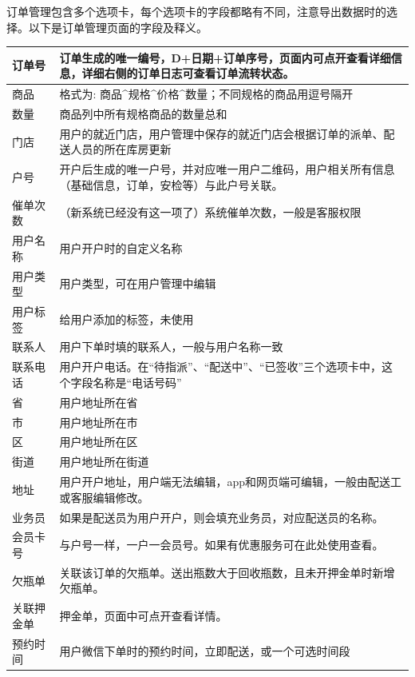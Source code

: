 \documentclass[UTF8]{ctexart}
\begin{document}
订单管理包含多个选项卡，每个选项卡的字段都略有不同，注意导出数据时的选择。以下是订单管理页面的字段及释义。

\begin{longtable}[h!]{ | m{3cm} | m{12cm} | } 

		\hline
		订单号 & 订单生成的唯一编号，D+日期+订单序号，页面内可点开查看详细信息，详细右侧的订单日志可查看订单流转状态。\\
		\hline
		商品 & 格式为: 商品\^{}规格\^{}价格\^{}数量；不同规格的商品用逗号隔开\\
		\hline
		数量 & 商品列中所有规格商品的数量总和\\
		\hline
		门店 & 用户的就近门店，用户管理中保存的就近门店会根据订单的派单、配送人员的所在库房更新\\
		\hline
		户号 & 开户后生成的唯一户号，并对应唯一用户二维码，用户相关所有信息（基础信息，订单，安检等）与此户号关联。\\
		\hline
		催单次数 & （新系统已经没有这一项了）系统催单次数，一般是客服权限\\
		\hline
		用户名称& 用户开户时的自定义名称\\
		\hline
		用户类型& 用户类型，可在用户管理中编辑\\
		\hline
		用户标签& 给用户添加的标签，未使用\\
		\hline
		联系人& 用户下单时填的联系人，一般与用户名称一致\\
		\hline
		联系电话& 用户开户电话。在“待指派”、“配送中”、“已签收”三个选项卡中，这个字段名称是“电话号码”\\
		\hline
		省& 用户地址所在省\\
		\hline
		市& 用户地址所在市\\
		\hline
		区& 用户地址所在区\\
		\hline
		街道& 用户地址所在街道\\
		\hline
		地址& 用户开户地址，用户端无法编辑，app和网页端可编辑，一般由配送工或客服编辑修改。 \\
		\hline
		业务员& 如果是配送员为用户开户，则会填充业务员，对应配送员的名称。\\
		\hline
		会员卡号& 与户号一样，一户一会员号。如果有优惠服务可在此处使用查看。\\
		\hline
		欠瓶单& 关联该订单的欠瓶单。送出瓶数大于回收瓶数，且未开押金单时新增欠瓶单。\\
		\hline
		关联押金单& 押金单，页面中可点开查看详情。\\
		\hline
		预约时间& 用户微信下单时的预约时间，立即配送，或一个可选时间段\\

\end{longtable}
\end{document}
